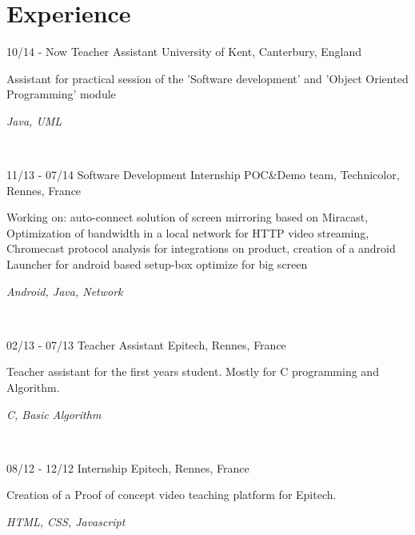 \documentclass[]{friggeri-cv}
\begin{document}
\section{Experience}
\begin{entrylist}
  \entry
    {10/14 - Now}
    {Teacher Assistant}
    {University of Kent, Canterbury, England}
    {Assistant for practical session of the 'Software development' and 'Object Oriented Programming' module
    \begin{FlushRight}\textit{Java, UML}\end{FlushRight}~}
  \entry
    {11/13 - 07/14}
    {Software Development Internship}
    {POC\&Demo team, Technicolor, Rennes, France}
    {Working on: auto-connect solution of screen mirroring based on Miracast, Optimization of bandwidth in a local network for HTTP video streaming, Chromecast protocol analysis for integrations on product, creation of a android Launcher for android based setup-box optimize for big screen \begin{FlushRight}\textit{Android, Java, Network}\end{FlushRight} ~}
    \entry
    {02/13 - 07/13}
    {Teacher Assistant}
    {Epitech, Rennes, France}
    {Teacher assistant for the first years student. Mostly for C programming and Algorithm.
    \begin{FlushRight}\textit{C, Basic Algorithm}\end{FlushRight} ~}
    \entry
    {08/12 - 12/12}
    {Internship}
    {Epitech, Rennes, France}
    {Creation of a Proof of concept video teaching platform for Epitech.
    \begin{FlushRight}\textit{HTML, CSS, Javascript}\end{FlushRight}}
\end{entrylist}
\end{document}

